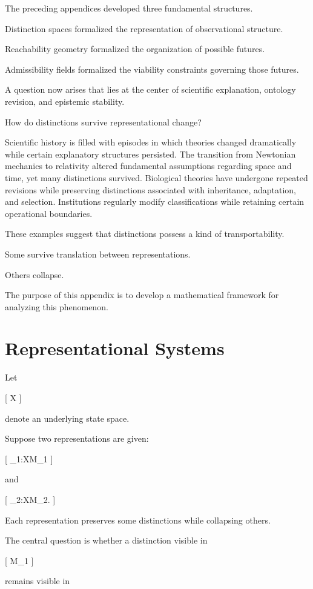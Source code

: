 \documentclass[11pt,oneside,openany]{book}
\begin{document}
The preceding appendices developed three fundamental structures.

Distinction spaces formalized the representation of observational structure.

Reachability geometry formalized the organization of possible futures.

Admissibility fields formalized the viability constraints governing those futures.

A question now arises that lies at the center of scientific explanation, ontology revision, and epistemic stability.

How do distinctions survive representational change?

Scientific history is filled with episodes in which theories changed dramatically while certain explanatory structures persisted. The transition from Newtonian mechanics to relativity altered fundamental assumptions regarding space and time, yet many distinctions survived. Biological theories have undergone repeated revisions while preserving distinctions associated with inheritance, adaptation, and selection. Institutions regularly modify classifications while retaining certain operational boundaries.

These examples suggest that distinctions possess a kind of transportability.

Some survive translation between representations.

Others collapse.

The purpose of this appendix is to develop a mathematical framework for analyzing this phenomenon.

\section{Representational Systems}

Let

[
X
]

denote an underlying state space.

Suppose two representations are given:

[
\pi_1:X\rightarrow M_1
]

and

[
\pi_2:X\rightarrow M_2.
]

Each representation preserves some distinctions while collapsing others.

The central question is whether a distinction visible in

[
M_1
]

remains visible in
\end{document}
